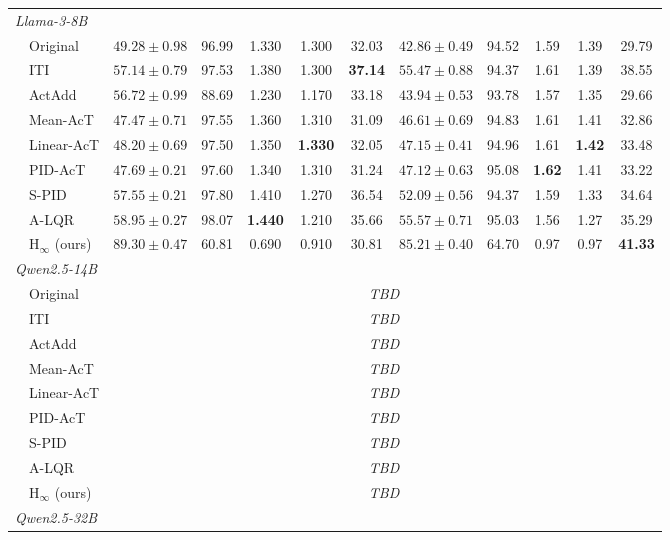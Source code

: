 \begin{table}[!htbp]
{\begin{tabular}{llccccc|ccccc}
\midrule
\multicolumn{12}{l}{\textit{Llama-3-8B}} \\
& Original
& $49.28\!\pm\!0.98$ & 96.99 & 1.330 & 1.300 & 32.03
& $42.86\!\pm\!0.49$ & 94.52 & 1.59 & 1.39 & 29.79 \\
& ITI
& $57.14\!\pm\!0.79$ & 97.53 & 1.380 & 1.300 & \textbf{37.14}
& $55.47\!\pm\!0.88$ & 94.37 & 1.61 & 1.39 & 38.55 \\
& ActAdd
& $56.72\!\pm\!0.99$ & 88.69 & 1.230 & 1.170 & 33.18
& $43.94\!\pm\!0.53$ & 93.78 & 1.57 & 1.35 & 29.66 \\
& Mean-AcT
& $47.47\!\pm\!0.71$ & 97.55 & 1.360 & 1.310 & 31.09
& $46.61\!\pm\!0.69$ & 94.83 & 1.61 & 1.41 & 32.86 \\
& Linear-AcT
& $48.20\!\pm\!0.69$ & 97.50 & 1.350 & \textbf{1.330} & 32.05
& $47.15\!\pm\!0.41$ & 94.96 & 1.61 & \textbf{1.42} & 33.48 \\
& PID-AcT
& $47.69\!\pm\!0.21$ & 97.60 & 1.340 & 1.310 & 31.24
& $47.12\!\pm\!0.63$ & 95.08 & \textbf{1.62} & 1.41 & 33.22 \\
& S-PID
& $57.55\!\pm\!0.21$ & 97.80 & 1.410 & 1.270 & 36.54
& $52.09\!\pm\!0.56$ & 94.37 & 1.59 & 1.33 & 34.64 \\
& A-LQR
& $58.95\!\pm\!0.27$ & 98.07 & \textbf{1.440} & 1.210 & 35.66
& $55.57\!\pm\!0.71$ & 95.03 & 1.56 & 1.27 & 35.29 \\
& $\mathrm{H}_{\infty}$ (ours)
& $\mathbf{89.30\!\pm\!0.47}$ & 60.81 & 0.690 & 0.910 & 30.81
& $\mathbf{85.21\!\pm\!0.40}$ & 64.70 & 0.97 & 0.97 & \textbf{41.33} \\
\midrule
\multicolumn{12}{l}{\textit{Qwen2.5-14B}} \\
& Original & \multicolumn{10}{c}{\textit{TBD}} \\
& ITI & \multicolumn{10}{c}{\textit{TBD}} \\
& ActAdd & \multicolumn{10}{c}{\textit{TBD}} \\
& Mean-AcT & \multicolumn{10}{c}{\textit{TBD}} \\
& Linear-AcT & \multicolumn{10}{c}{\textit{TBD}} \\
& PID-AcT & \multicolumn{10}{c}{\textit{TBD}} \\
& S-PID & \multicolumn{10}{c}{\textit{TBD}} \\
& A-LQR & \multicolumn{10}{c}{\textit{TBD}} \\
& $\mathrm{H}_{\infty}$ (ours) & \multicolumn{10}{c}{\textit{TBD}} \\
\midrule
\multicolumn{12}{l}{\textit{Qwen2.5-32B}} \\

\end{tabular}}
\end{table}
